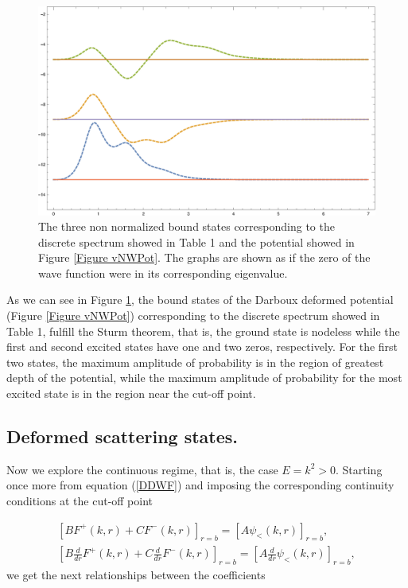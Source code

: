 \documentclass[a4paper]{jpconf}
\begin{document}
\begin{figure}
\begin{center}
\includegraphics[scale=0.3]{Bound_states.eps}
\end{center}
\caption{\label{DDT-FigBS} The three non normalized bound states corresponding to the discrete spectrum showed in Table 1 and the potential showed in Figure \ref{Figure vNWPot}. The graphs are shown as if the zero of the wave function were in its corresponding eigenvalue.}
\end{figure}

As we can see in Figure \ref{DDT-FigBS}, the bound states of the Darboux deformed potential (Figure \ref{Figure vNWPot})  corresponding to the discrete spectrum showed in Table 1, fulfill the Sturm theorem, that is, the ground state is nodeless while the first and second excited states have one and two zeros, respectively. For the first two states, the maximum amplitude of probability is in the region of greatest depth of the potential, while the maximum amplitude of probability for the most excited state is in the region near the cut-off point.

\subsection{Deformed scattering states.}
Now we explore the continuous regime, that is, the case $E=k^2>0$.  Starting once more  from equation (\ref{DDWF}) and imposing the corresponding continuity conditions at  the cut-off point


\begin{equation}
\begin{array}{c}
\left[B F^{+}(k,r)+C F^{-}(k,r)\right]_{r=b}=[A\psi_{<}(k,r)]_{r=b},\\
\left[B \frac{d}{dr}F^{+}(k,r)+C \frac{d}{dr}F^{-}(k,r)\right]_{r=b}=[A \frac{d}{dr}\psi_{<}(k,r)]_{r=b},
\end{array}
\end{equation}
we get the next relationships between the coefficients 
\end{document}
